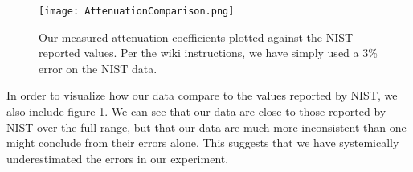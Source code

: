 \documentclass[letter]{article}
\begin{document}


\begin{figure}[h] \centering
    \texttt{[image: AttenuationComparison.png]}
    \caption{Our measured attenuation coefficients plotted against the NIST reported values. Per the wiki instructions, we have simply used a 3\% error on the NIST data.}
    \label{fig:AttenComp}
\end{figure}

In order to visualize how our data compare to the values reported by NIST, we also include figure \ref{fig:AttenComp}. We can see that our data are close to those reported by NIST over the full range, but that our data are much more inconsistent than one might conclude from their errors alone. This suggests that we have systemically underestimated the errors in our experiment.
\end{document}
